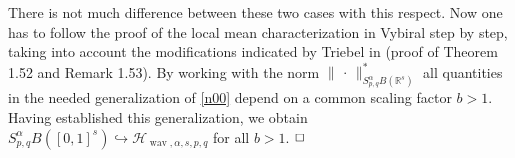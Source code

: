 \documentclass[12pt]{article}
\DeclareMathOperator{\wav}{wav}
\newtheorem{theorem}{Theorem}
\newtheorem{corollary}{Corollary}
\newtheorem{proposition}{Proposition}
\newenvironment{proof}{\begin{trivlist}
    \item[\hskip\labelsep{\it Proof.}]}{$\hfill\Box$\end{trivlist}}
\newcommand{\real}{\mathbb{R}}
\newcommand{\HH}{\mathcal{H}}
\newcommand{\N}{\mathbb{N}}
\newcommand{\be}{\begin{equation}}
\newcommand{\ee}{\end{equation}}
\newcommand{\beqq}{\begin{eqnarray*}}
\newcommand{\eeqq}{\end{eqnarray*}}
\newcommand{\mig}[1]{\textcolor{blue}{#1}}
\newcommand{\red}[1]{\textcolor{red}{#1}}
\begin{document}
\begin{proof}
There is not much difference between these two cases with this respect.
Now one has to follow the proof of the local mean characterization in Vybiral \cite{Vy}
step by step, taking into account the modifications indicated by Triebel in \cite{Tri10} (proof of Theorem 1.52 and Remark 1.53). By working with the norm $\|\, \cdot \, \|_{S^\alpha_{p,q}B(\real^s)}^*$
all quantities in the needed generalization of \eqref{n00} depend on a common scaling factor $b>1$.
Having established this generalization, we obtain
$S^\alpha_{p,q}B([0,1]^s) \hookrightarrow \HH_{\wav,\alpha,s,p,q}$ for all $b >1$.
 \end{proof}
 

\end{document}

